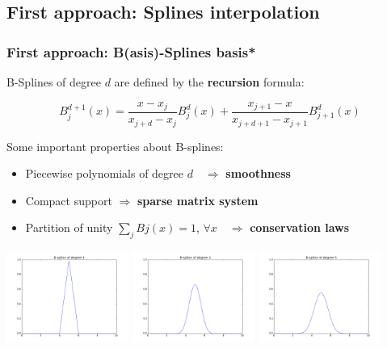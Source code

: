 \documentclass[]{beamer}
\begin{document}
\subsection{First approach: Splines interpolation}
\begin{frame}
	\frametitle{First approach: B(asis)-Splines basis*}

	B-Splines of degree $d$ are defined by the \textbf{recursion} formula: 

	\begin{equation}
	B_j^{d+1}(x)= \dfrac{x - x_j}{x_{j+d}-x_j} B_j^d(x)+ \dfrac{x_{j+1} - x}{x_{j+d+1} - x_{j+1}} B_{j+1}^d (x)
	\end{equation}

	Some important properties about B-splines:

	\begin{itemize}
		\item Piecewise polynomials of degree $d \quad \Rightarrow$ \textbf{smoothness} 
		\item Compact support $\Rightarrow$ \textbf{sparse matrix system}
		\item Partition of unity $\sum_j Bj (x) = 1$, $\forall x \quad \Rightarrow$ \textbf{conservation laws}
	\end{itemize}

	\begin{center}
		\includegraphics[width = 0.3\textwidth]{bsplines1.png}
		\includegraphics[width = 0.3\textwidth]{bsplines3.png}
		\includegraphics[width = 0.3\textwidth]{bsplines5.png}
	\end{center}

\end{frame}
\end{document}
